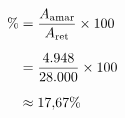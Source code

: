 \documentclass[preview]{standalone}
\begin{document}
\begin{align*}
\special{dvisvgm:raw <g id='unique000'>}\% &= \frac{A_{\text{amar}}}{A_{\text{ret}}} \times 100 \\[6pt] \special{dvisvgm:raw </g>}\special{dvisvgm:raw <g id='unique001'>}&= \frac{4{.}948}{28{.}000} \times 100 \\[6pt] \special{dvisvgm:raw </g>}\special{dvisvgm:raw <g id='unique002'>}&\approx 17{,}67\%\special{dvisvgm:raw </g>}
\end{align*}
\end{document}
